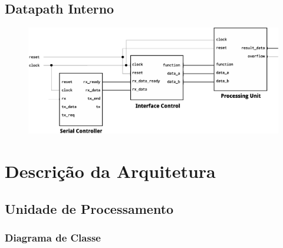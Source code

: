 \documentclass{report}
\begin{document}
  \section{Datapath Interno}
    \begin{figure}[H]
      \centering
      \includegraphics[width=\linewidth]{datapath/ip_datapath.eps}
    \end{figure}

\chapter{Descrição da Arquitetura}

  \section{Unidade de Processamento}

    \subsection{Diagrama de Classe}
      \begin{figure}[H]
      \centering
      
    \end{figure}
\end{document}
